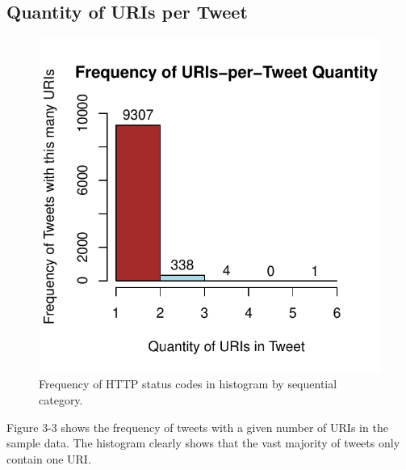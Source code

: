 \documentclass[a4paper,12pt]{article}
\begin{document}
\subsection{Quantity of URIs per Tweet}
\begin{figure}[H]
    \centering
    \includegraphics{stats/uris_per_tweet.pdf}
    \caption{Frequency of HTTP status codes in histogram by sequential category.}
\end{figure}
Figure 3-3 shows the frequency of tweets with a given number of URIs in the sample data. The
histogram clearly shows that the vast majority of tweets only contain one URI.
\end{document}
